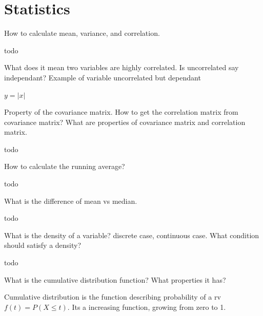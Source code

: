 \documentclass[answers]{exam}
\begin{document}
\newpage
\section{Statistics}
\begin{questions}

\question How to calculate mean, variance, and correlation.
\begin{solution}[.2in]
	todo
\end{solution}

\question What does it mean two variables are highly correlated. Is uncorrelated say independant? Example of variable uncorrelated but dependant
\begin{solution}[.2in]
	$y=|x|$
\end{solution}

\question Property of the covariance matrix. How to get the correlation matrix from covariance matrix? What are properties of covariance matrix and correlation matrix.
\begin{solution}[.2in]
	todo
\end{solution}

\question How to calculate the running average?
\begin{solution}[.2in]
	todo
\end{solution}

\question What is the difference of mean vs median.
\begin{solution}[.2in]
	todo
\end{solution}

\question What is the density of a variable? discrete case, continuous case. What condition should satisfy a density?
\begin{solution}[.2in]
	todo
\end{solution}

\question What is the cumulative distribution function? What properties it has?
\begin{solution}[.2in]
Cumulative distribution is the function describing probability of a rv $f(t) = P(X\leq t)$. Its a increasing function, growing from zero to 1.
\end{solution}


\end{questions}
\end{document}
